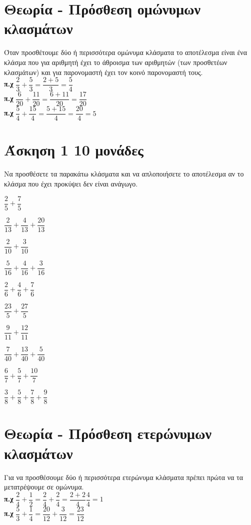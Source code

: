 \documentclass[a4paper,10pt]{report}
\begin{document}
\section*{Θεωρία - Πρόσθεση ομώνυμων κλασμάτων\hfill \small{}}
Όταν προσθέτουμε δύο ή περισσότερα ομώνυμα κλάσματα το αποτέλεσμα είναι ένα κλάσμα που για 
αριθμητή έχει το άθροισμα των αριθμητών (των προσθετέων κλασμάτων) και για παρονομαστή έχει 
τον κοινό παρονομαστή τους.\\
\textbf{π.χ} $\dfrac{2}{3}+\dfrac{5}{3}=\dfrac{2+5}{3}=\dfrac{5}{4}$\\
\textbf{π.χ} $\dfrac{6}{20}+\dfrac{11}{20}=\dfrac{6+11}{20}=\dfrac{17}{20}$\\
\textbf{π.χ} $\dfrac{5}{4}+\dfrac{15}{4}=\dfrac{5+15}{4}=\dfrac{20}{4}=5$



\section*{Άσκηση 1  \hfill \small{10 μονάδες}}
Να προσθέσετε τα παρακάτω κλάσματα και να απλοποιήσετε το αποτέλεσμα αν το κλάσμα 
που έχει προκύψει δεν είναι ανάγωγο.
\begin{enumerate}[1)]
\begin{multicols}{2}
 \item $\dfrac{2}{5}+\dfrac{7}{5}$
 \item $\dfrac{2}{13}+\dfrac{4}{13}+\dfrac{20}{13}$
 \item $\dfrac{2}{10}+\dfrac{3}{10}$
 \item $\dfrac{5}{16}+\dfrac{4}{16}+\dfrac{3}{16}$
 \item $\dfrac{2}{6}+\dfrac{4}{6}+\dfrac{7}{6}$
 \item $\dfrac{23}{5}+\dfrac{27}{5}$
 \item $\dfrac{9}{11}+\dfrac{12}{11}$
 \item $\dfrac{7}{40}+\dfrac{13}{40}+\dfrac{5}{40}$
 \item $\dfrac{6}{7}+\dfrac{5}{7}+\dfrac{10}{7}$
 \item $\dfrac{3}{8}+\dfrac{5}{8}+\dfrac{7}{8}+\dfrac{9}{8}$
\end{multicols}
\end{enumerate}


\section*{Θεωρία - Πρόσθεση ετερώνυμων κλασμάτων\hfill \small{}}
Για να προσθέσουμε δύο ή περισσότερα ετερώνυμα κλάσματα πρέπει πρώτα να τα μετατρέψουμε σε ομώνυμα. \\
\textbf{π.χ} $\dfrac{2}{4}+\dfrac{1}{2}=\dfrac{2}{4}+\dfrac{2}{4}=\dfrac{2+2}{4}\dfrac{4}{4}=1$\\
\textbf{π.χ} $\dfrac{5}{3}+\dfrac{1}{4}=\dfrac{20}{12}+\dfrac{3}{12}=\dfrac{23}{12}$
\end{document}
